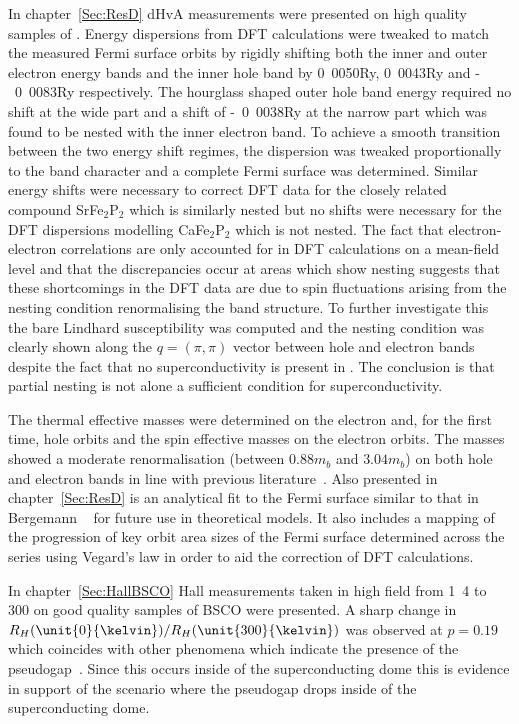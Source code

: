 
In chapter~\ref{Sec:ResD} \ac{dHvA} measurements were presented on high quality samples of \BaFeP. Energy dispersions from \ac{DFT} calculations were tweaked to match the measured Fermi surface orbits by rigidly shifting both the inner and outer electron energy bands and the inner hole band by \unit{0.0050}{\textrm{Ry}}, \unit{0.0043}{\textrm{Ry}} and \unit{-0.0083}{\textrm{Ry}} respectively. The hourglass shaped outer hole band energy required no shift at the wide part and a shift of \unit{-0.0038}{\textrm{Ry}} at the narrow part which was found to be nested with the inner electron band. To achieve a smooth transition between the two energy shift regimes, the dispersion was tweaked proportionally to the \DzTwo{} band character and a complete Fermi surface was determined. Similar energy shifts were necessary to correct \ac{DFT} data for the closely related compound SrFe$_2$P$_2$ which is similarly nested but no shifts were necessary for the \ac{DFT} dispersions modelling CaFe$_2$P$_2$ which is not nested. The fact that electron-electron correlations are only accounted for in \ac{DFT} calculations on a mean-field level and that the discrepancies occur at areas which show nesting suggests that these shortcomings in the \ac{DFT} data are due to spin fluctuations arising from the nesting condition renormalising the band structure. To further investigate this the bare Lindhard susceptibility was computed and the nesting condition was clearly shown along the $q = (\pi, \pi)$ vector between hole and electron bands despite the fact that no superconductivity is present in \BaFeP. The conclusion is that partial nesting is not alone a sufficient condition for superconductivity.

The thermal effective masses were determined on the electron and, for the first time, hole orbits and the spin effective masses on the electron orbits. The masses showed a moderate renormalisation (between $\unit{0.88}{m_b}$ and $\unit{3.04}{m_b}$) on both hole and electron bands in line with previous literature~\cite{Shishido2010}.  Also presented in chapter~\ref{Sec:ResD} is an analytical fit to the Fermi surface similar to that in Bergemann \etal~\cite{Bergemann2000} for future use in theoretical models. It also includes a mapping of the progression of key orbit area sizes of the Fermi surface determined across the \BaFeAsP{} series using Vegard's law in order to aid the correction of \ac{DFT} calculations.

In chapter~\ref{Sec:HallBSCO} Hall measurements taken in high field from \unit{1.4}{\kelvin} to \unit{300}{\kelvin} on good quality samples of \ac{BSCO} were presented. A sharp change in $R_H(\unit{0}{\kelvin})/R_H(\unit{300}{\kelvin})$ was observed at $p=0.19$ which coincides with other phenomena which indicate the presence of the pseudogap~\cite{Tallon2001}. Since this occurs inside of the superconducting dome this is evidence in support of the scenario where the pseudogap drops inside of the superconducting dome.

